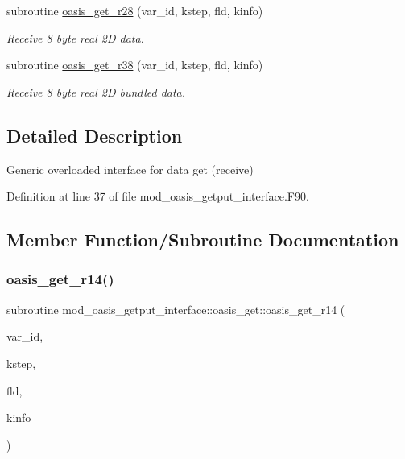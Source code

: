 \begin{DoxyCompactItemize}
subroutine \hyperlink{interfacemod__oasis__getput__interface_1_1oasis__get_a4a267e854a4e856f082bc8a3c51385ee}{oasis\+\_\+get\+\_\+r28} (var\+\_\+id, kstep, fld, kinfo)
\begin{DoxyCompactList}\small\item\em Receive 8 byte real 2D data. \end{DoxyCompactList}\item 
subroutine \hyperlink{interfacemod__oasis__getput__interface_1_1oasis__get_a3f693dda147531af4b25f255e4363890}{oasis\+\_\+get\+\_\+r38} (var\+\_\+id, kstep, fld, kinfo)
\begin{DoxyCompactList}\small\item\em Receive 8 byte real 2D bundled data. \end{DoxyCompactList}\end{DoxyCompactItemize}


\subsection{Detailed Description}
Generic overloaded interface for data get (receive) 

Definition at line 37 of file mod\+\_\+oasis\+\_\+getput\+\_\+interface.\+F90.



\subsection{Member Function/\+Subroutine Documentation}
\mbox{\label{interfacemod__oasis__getput__interface_1_1oasis__get_af8755eb7d3a5f52268752317dd955547}} 
\subsubsection{\texorpdfstring{oasis\+\_\+get\+\_\+r14()}{oasis\_get\_r14()}}
{\footnotesize\ttfamily subroutine mod\+\_\+oasis\+\_\+getput\+\_\+interface\+::oasis\+\_\+get\+::oasis\+\_\+get\+\_\+r14 (\begin{DoxyParamCaption}\item[{integer(kind=ip\+\_\+i4\+\_\+p), intent(in)}]{var\+\_\+id,  }\item[{integer(kind=ip\+\_\+i4\+\_\+p), intent(in)}]{kstep,  }\item[{real(kind=ip\+\_\+single\+\_\+p), dimension(\+:), intent(inout)}]{fld,  }\item[{integer(kind=ip\+\_\+i4\+\_\+p), intent(out)}]{kinfo }\end{DoxyParamCaption})\hspace{0.3cm}{\ttfamily [private]}}



